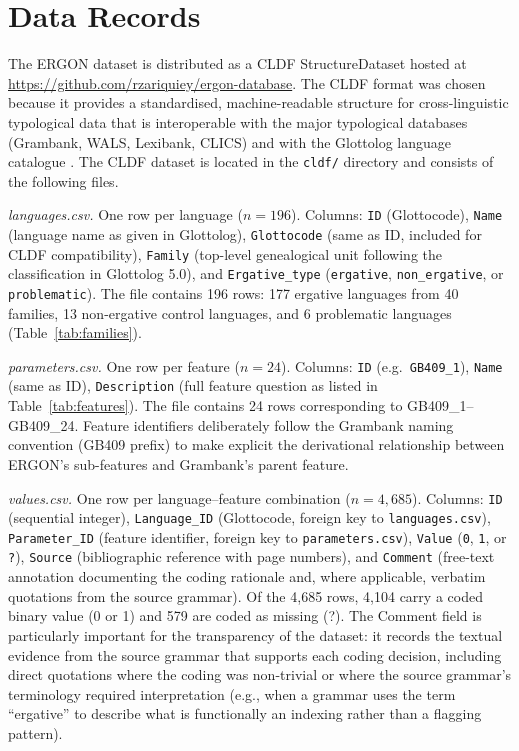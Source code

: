 \documentclass[12pt,a4paper]{article}
\newcommand{\feat}[1]{\texttt{#1}}
\begin{document}
\section{Data Records}

The ERGON dataset is distributed as a CLDF StructureDataset \cite{forkel2018} hosted at \url{https://github.com/rzariquiey/ergon-database}. The CLDF format was chosen because it provides a standardised, machine-readable structure for cross-linguistic typological data that is interoperable with the major typological databases (Grambank, WALS, Lexibank, CLICS) and with the Glottolog language catalogue \cite{hammarstrom2024}. The CLDF dataset is located in the \texttt{cldf/} directory and consists of the following files.

\textit{languages.csv.} One row per language ($n = 196$). Columns: \texttt{ID} (Glottocode), \texttt{Name} (language name as given in Glottolog), \texttt{Glottocode} (same as ID, included for CLDF compatibility), \texttt{Family} (top-level genealogical unit following the classification in Glottolog 5.0), and \texttt{Ergative\_type} (\texttt{ergative}, \texttt{non\_ergative}, or \texttt{problematic}). The file contains 196 rows: 177 ergative languages from 40 families, 13 non-ergative control languages, and 6 problematic languages (Table~\ref{tab:families}).

\textit{parameters.csv.} One row per feature ($n = 24$). Columns: \texttt{ID} (e.g.\ \feat{GB409\_1}), \texttt{Name} (same as ID), \texttt{Description} (full feature question as listed in Table~\ref{tab:features}). The file contains 24 rows corresponding to GB409\_1--GB409\_24. Feature identifiers deliberately follow the Grambank naming convention (GB409 prefix) to make explicit the derivational relationship between ERGON's sub-features and Grambank's parent feature.

\textit{values.csv.} One row per language--feature combination ($n = 4{,}685$). Columns: \texttt{ID} (sequential integer), \texttt{Language\_ID} (Glottocode, foreign key to \texttt{languages.csv}), \texttt{Parameter\_ID} (feature identifier, foreign key to \texttt{parameters.csv}), \texttt{Value} (\texttt{0}, \texttt{1}, or \texttt{?}), \texttt{Source} (bibliographic reference with page numbers), and \texttt{Comment} (free-text annotation documenting the coding rationale and, where applicable, verbatim quotations from the source grammar). Of the 4,685 rows, 4,104 carry a coded binary value (0 or 1) and 579 are coded as missing (?). The Comment field is particularly important for the transparency of the dataset: it records the textual evidence from the source grammar that supports each coding decision, including direct quotations where the coding was non-trivial or where the source grammar's terminology required interpretation (e.g., when a grammar uses the term ``ergative'' to describe what is functionally an indexing rather than a flagging pattern).
\end{document}
